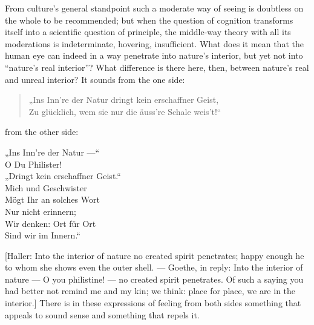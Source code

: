 \documentclass[12pt,a4paper]{book}
\begin{document}
From culture's general standpoint such a moderate way of seeing is doubtless on
the whole to be recommended; but when the question of cognition transforms itself
into a scientific question of principle, the middle-way theory with all its
moderations is indeterminate, hovering, insufficient. What does it mean that the
human eye can indeed in a way penetrate into nature's interior, but yet not into
``nature's real interior''? What difference is there here, then, between nature's
real and unreal interior? It sounds from the one side:

\begin{quote}
\noindent „Ins Inn're der Natur dringt kein erschaffner Geist,\\
Zu glücklich, wem sie nur die äuss're Schale weis't!“
\end{quote}

\noindent from the other side:

\begin{center}
„Ins Inn're der Natur ---“\\
O Du Philister!\\
„Dringt kein erschaffner Geist.“\\
Mich und Geschwister\\
Mögt Ihr an solches Wort\\
Nur nicht erinnern;\\
Wir denken: Ort für Ort\\
Sind wir im Innern.“
\end{center}

[Haller: Into the interior of nature no created spirit penetrates; happy enough he
to whom she shows even the outer shell. --- Goethe, in reply: Into the interior of
nature --- O you philistine! --- no created spirit penetrates. Of such a saying
you had better not remind me and my kin; we think: place for place, we are in the
interior.]
\setcounter{footnote}{0}
There is in these expressions of feeling from both sides something that appeals to
sound sense and something that repels it.
\end{document}
